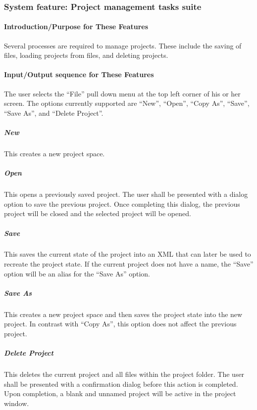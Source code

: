 \documentclass[twoside,letterpaper]{article}
\begin{document}
\clearpage






\subsubsection[System feature: [Project management tasks suite]{\bfseries System feature: Project management tasks suite}

\paragraph[\ Introduction/Purpose for These Features] 
{\bfseries Introduction/Purpose for These Features}
{
Several processes are required to manage projects. These include the saving of files, loading projects from files, and deleting projects.}


\paragraph[Input/Output sequence for this feature]
{\bfseries Input/Output sequence for These Features}
{
The user selects the ``File'' pull down menu at the top left corner of his or her screen. The options currently supported are ``New'', ``Open'', ``Copy As'', ``Save'', ``Save As'', and ``Delete Project''. }

\subparagraph{New}
{
This creates a new project space. }

\subparagraph{Open}
{
This opens a previously saved project. The user shall be presented with a dialog option to save the previous project. Once completing this dialog, the previous project will be closed and the selected project will be opened.}

\subparagraph{Save}
{
This saves the current state of the project into an XML that can later be used to recreate the project state. If the current project does not have a name, the ``Save'' option will be an alias for the ``Save As'' option.}

\subparagraph{Save As}
{
This creates a new project space and then saves the project state into the new project. In contrast with ``Copy As'', this option does not affect the previous project. }

\subparagraph{Delete Project}
{
This deletes the current project and all files within the project folder. The user shall be presented with a confirmation dialog before this action is completed. Upon completion, a blank and unnamed project will be active in the project window. }
\end{document}
